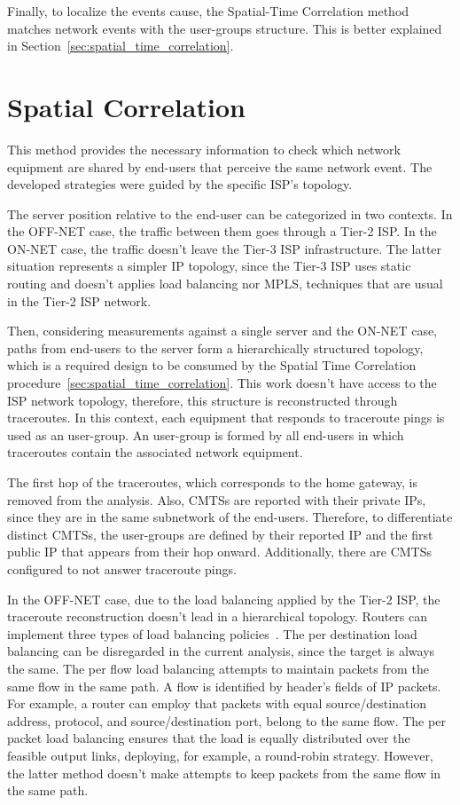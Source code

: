 Finally, to localize the events cause, the Spatial-Time Correlation method
matches network events with the user-groups structure.
This is better explained in Section~\ref{sec:spatial_time_correlation}.

\section{Spatial Correlation}
\label{sec:spatial_correlation}

This method provides the necessary information to check which network equipment
are shared by end-users that perceive the same network event.
The developed strategies were guided by the specific ISP's topology.

The server position relative to the end-user
can be categorized in two contexts.
In the OFF-NET case, the traffic between them
goes through a Tier-2 ISP\@.
In the ON-NET case, the traffic
doesn't leave the Tier-3 ISP infrastructure.
The latter situation represents a simpler IP topology, since the Tier-3 ISP
uses static routing and
doesn't applies load balancing nor MPLS, techniques that are usual in the Tier-2
ISP network.

Then, considering measurements against a single server and the ON-NET
case, paths from end-users to the server form a hierarchically
structured topology, which is a required design to be consumed by the
Spatial Time Correlation procedure~\ref{sec:spatial_time_correlation}.
This work doesn't have access to the ISP network
topology, therefore, this structure is reconstructed through traceroutes.
In this context, each equipment that responds to traceroute
pings is used as an user-group.
An user-group is formed by all end-users in which traceroutes contain the
associated network equipment.

The first hop of the traceroutes, which corresponds to the home gateway, is
removed from the analysis. Also, CMTSs are reported with their private IPs,
since they are in the same subnetwork of the end-users.
Therefore, to differentiate distinct CMTSs, the
user-groups are defined by their reported IP and the first public IP that
appears from their hop onward. Additionally, there are CMTSs
configured to not answer traceroute pings.

In the OFF-NET case, due to the load balancing applied by the Tier-2 ISP,
the traceroute reconstruction doesn't lead in a hierarchical topology.
Routers can implement three types of load balancing
policies~\cite{avoiding_traceroute_anomalies_with_paris_traceroute}.
The per
destination load balancing can be disregarded in the current analysis, since
the target is always the same. The per flow load balancing attempts to
maintain packets from the same flow in the same path. A flow is identified
by header's fields of IP packets. For example, a
router can employ that packets with equal source/destination
address, protocol, and source/destination port,
belong to the same flow. The per packet load
balancing ensures that the load is equally distributed over the feasible output
links, deploying, for example, a round-robin strategy. However, the latter
method doesn't
make attempts to keep packets from the same flow in the same path.

